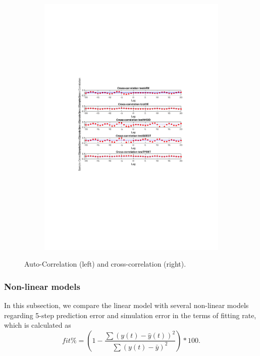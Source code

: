 \documentclass[]{article}
\begin{document}
\begin{figure}[ht]
\begin{subfigure}{.49\textwidth}
	\includegraphics[trim= 10cm 8cm 10cm 8cm, scale=0.4]{figures/cross-corr-1step.pdf}
\end{subfigure}
\caption{Auto-Correlation (left) and cross-correlation (right).}
\label{fig:correlations}
\end{figure}

\subsubsection{Non-linear models}

In this subsection, we compare the linear model with several non-linear models regarding 5-step prediction error and simulation error in the terms of fitting rate, which is calculated as
\begin{equation}
	fit\% = (1-\frac{\sum(y(t)-\hat{y}(t))^2}{\sum(y(t)-\bar{y})^2})*100.
\end{equation}
\end{document}
